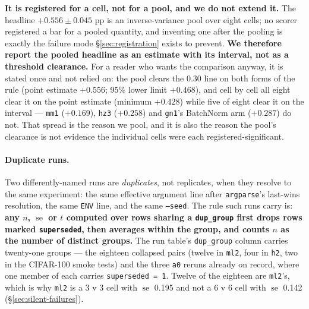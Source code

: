 \documentclass[10pt,letterpaper]{article}
\newcommand{\arm}[1]{\texttt{#1}}
\DeclareMathOperator{\se}{se}
\begin{document}
\textbf{It is registered for a cell, not for a pool, and we do not extend it.} The headline
$+0.556 \pm 0.045$ pp is an inverse-variance pool over eight cells; no scorer registered a bar
for a pooled quantity, and inventing one after the pooling is exactly the failure mode
\S\ref{sec:registration} exists to prevent. \textbf{We therefore report the pooled headline as an
estimate with its interval, not as a threshold clearance.} For a reader who wants the comparison
anyway, it is stated once and not relied on: the pool clears the 0.30 line on both forms of the
rule (point estimate $+0.556$; 95\% lower limit $+0.468$), and cell by cell all eight clear it on
the point estimate (minimum $+0.428$) while five of eight clear it on the interval ---
\arm{mm1} ($+0.169$), \arm{hz3} ($+0.258$) and \arm{gn1}'s BatchNorm arm ($+0.287$) do not. That
spread is the reason we pool, and it is also the reason the pool's clearance is not evidence the
individual cells were each registered-significant.

\paragraph{Duplicate runs.}
Two differently-named runs are \emph{duplicates}, not replicates, when they resolve to the same
experiment: the same effective argument line after \texttt{argparse}'s last-wins resolution, the
same \texttt{ENV} line, and the same \texttt{--seed}. The rule such runs carry is: \textbf{any
$n$, $\se$ or $t$ computed over rows sharing a \texttt{dup\_group} first drops rows marked
\texttt{superseded}, then averages within the group, and counts $n$ as the number of distinct
groups.} The run table's \texttt{dup\_group} column carries twenty-one groups --- the eighteen
collapsed pairs (twelve in \arm{ml2}, four in \arm{h2}, two in the CIFAR-100 smoke tests) and the
three \arm{a0} reruns already on record, where one member of each carries
\texttt{superseded = 1}. Twelve of the eighteen are \arm{ml2}'s,
which is why \arm{ml2} is a 3 v 3 cell with $\se$ 0.195 and not a 6 v 6 cell with $\se$ 0.142
(\S\ref{sec:silent-failures}).
\end{document}
